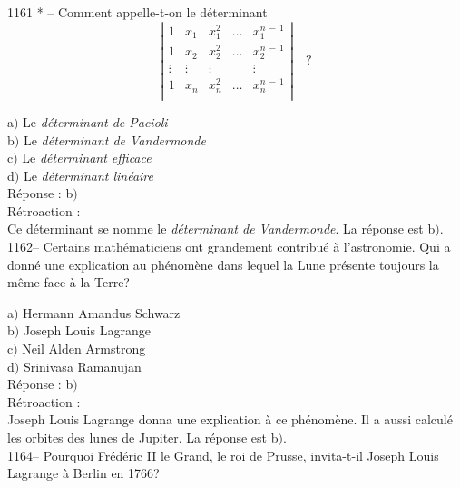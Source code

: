 ﻿\documentclass[letterpaper, 12pt]{article}
\begin{document}
1161 * -- Comment appelle-t-on le d\'eterminant
$$\left|\begin{matrix}
1      & x_1 & x_1^2 & \ldots & x_1^{n\,-\,1} \\
1      & x_2 & x_2^2 & \ldots & x_2^{n\,-\,1} \\
\vdots &\vdots &\vdots &      & \vdots    \\
1      & x_n & x_n^2 & \ldots & x_n^{n\,-\,1} \\
\end{matrix}\right|\quad?$$

a$)$ Le {\sl d\'eterminant de Pacioli} \\
b$)$ Le {\sl d\'eterminant de Vandermonde} \\
c$)$ Le {\sl d\'eterminant efficace} \\
d$)$ Le {\sl d\'eterminant lin\'eaire}  \\

R\'eponse : b$)$\\

R\'etroaction : \\
Ce d\'eterminant se nomme le {\sl d\'eterminant de Vandermonde}. La
r\'eponse est b$)$.\\

1162-- Certains math\'ematiciens ont grandement contribu\'e \`a
l'astronomie. Qui a donn\'e une explication au ph\'enom\`ene dans
lequel la Lune pr\'esente toujours la m\^eme face \`a la Terre?

a$)$ Hermann Amandus Schwarz \\
b$)$ Joseph Louis Lagrange \\
c$)$ Neil Alden Armstrong \\
d$)$ Srinivasa Ramanujan\\

R\'eponse : b$)$\\

R\'etroaction : \\
Joseph Louis Lagrange donna une explication \`a ce ph\'enom\`ene. Il
a aussi calcul\'e les orbites des lunes de Jupiter.
La r\'eponse est b$)$.\\













1164-- Pourquoi Fr\'ed\'eric II le Grand, le roi de Prusse,
invita-t-il Joseph Louis Lagrange \`a Berlin en 1766?
\end{document}
